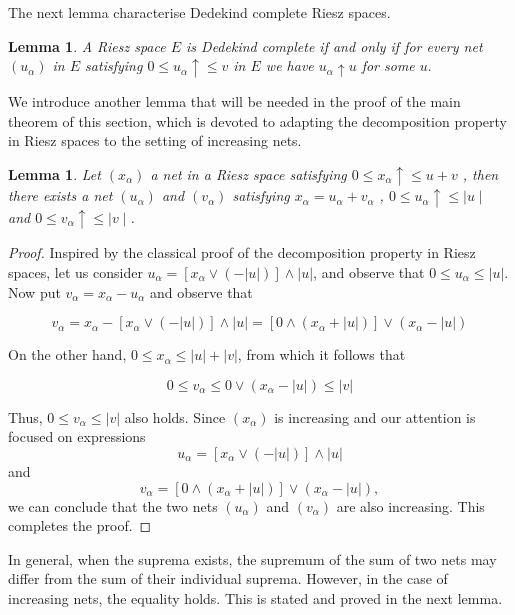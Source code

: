 \documentclass{birkau}
\numberwithin{equation}{section}
\theoremstyle{plain}
\newtheorem{lemma}[theorem]{Lemma}
\theoremstyle{definition}
\begin{document}
The next lemma characterise Dedekind complete Riesz spaces.
\begin{lemma}\cite[Lemma 1.39]{locallysolid}
	A Riesz space $E$ is Dedekind complete if and only if for every net $\left(
	u_{\alpha }\right) $ in $E$ satisfying $0\leq u_{\alpha }\uparrow \leq v$ in 
	$E$ we have $u_{\alpha }\uparrow u$ for some $u.$
\end{lemma}
We introduce another lemma that will be needed in the proof of the main theorem of this section, which is devoted to adapting the decomposition property in Riesz spaces to the setting of increasing nets.
\begin{lemma}
Let $ \left(x_{\alpha }\right) $ a net  in a Riesz space satisfying $ 0\leq x_{\alpha }\uparrow \leq u+v$ , then there exists a net $\left(u_{\alpha }\right) $ and $\left(v_{\alpha }\right) $ satisfying $x_{\alpha }=u_{\alpha }+v_{\alpha }$ , $0\leq u_{\alpha } \uparrow \leq \mid u\mid$ and $ 0\leq v_{\alpha }\uparrow \leq \mid v\mid $.
\end{lemma}
\begin{proof}
Inspired by the classical proof of the decomposition property in Riesz spaces, let us consider $u_{\alpha }=\left[x_{\alpha } \vee\left(-\left|u\right|\right)\right] \wedge\left|u\right|$, and observe that $0\leq u_{\alpha } \leq\left|u\right|.$ Now put $v_{\alpha }=x_{\alpha }-u_{\alpha }$ and observe that

$$
v_{\alpha }=x_{\alpha }-\left[x_{\alpha } \vee\left(-\left|u\right|\right)\right] \wedge\left|u\right|=\left[0 \wedge\left(x_{\alpha }+\left|u\right|\right)\right] \vee\left(x_{\alpha }-\left|u\right|\right)
$$


On the other hand,  $0\leq  x_{\alpha } \leq\left|u\right|+\left|v\right|$, from which it follows that

$$
0\leq  v_{\alpha } \leq 0 \vee\left(x_{\alpha }-\left|u\right|\right) \leq\left|v\right|
$$


Thus, $0\leq v_{\alpha } \leq\left|v\right|$ also holds.
Since $\left(x_{\alpha }\right)$ is increasing and our attention is focused on expressions $$u_{\alpha }=\left[x_{\alpha } \vee\left(-\left|u\right|\right)\right] \wedge\left|u\right|$$ and $$
v_{\alpha }=\left[0 \wedge\left(x_{\alpha }+\left|u\right|\right)\right] \vee\left(x_{\alpha }-\left|u\right|\right),
$$we can conclude that the two nets  $\left(u_{\alpha }\right) $  and $\left(v_{\alpha }\right)$ are also increasing. This completes the proof.
\end{proof}
In general,  when the suprema exists,  the supremum of the sum of two nets may differ from the sum of their individual suprema. However,  in the case of increasing nets,  the equality holds. This is stated and proved in the next lemma.
\end{document}
